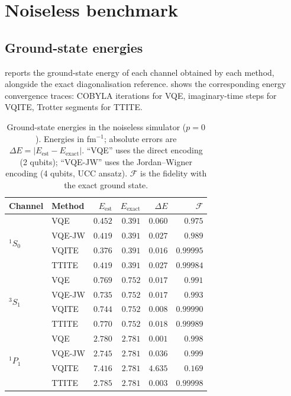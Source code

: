 \section{Noiseless benchmark}
\label{sec:noiseless}

\subsection{Ground-state energies}
\label{ssec:noiseless-ground}

 reports the ground-state energy of each channel
obtained by each method, alongside the exact diagonalisation reference.
 shows the corresponding energy convergence
traces: COBYLA iterations for VQE, imaginary-time steps for VQITE,
Trotter segments for TTITE.

\begin{table}[htbp]
\centering
\caption{Ground-state energies in the noiseless simulator
  ($p = 0$). Energies in fm$^{-1}$; absolute errors are
  $\Delta E = |E_{\mathrm{est}} - E_{\mathrm{exact}}|$. ``VQE'' uses
  the direct encoding (2 qubits); ``VQE-JW'' uses the Jordan--Wigner
  encoding (4 qubits, UCC ansatz). $\mathcal{F}$ is the fidelity with
  the exact ground state.}
\label{tab:noiseless}
\renewcommand{\arraystretch}{1.15}
\small
\begin{tabular}{llrrrr}
\toprule
Channel & Method   & $E_{\mathrm{est}}$ & $E_{\mathrm{exact}}$ & $\Delta E$  & $\mathcal{F}$ \\
\midrule
\multirow{4}{*}{${}^1S_0$}
        & VQE      & $0.452$ & $0.391$ & $0.060$ & $0.975$ \\
        & VQE-JW   & $0.419$ & $0.391$ & $0.027$ & $0.989$ \\
        & VQITE    & $0.376$ & $0.391$ & $0.016$ & $0.99995$ \\
        & TTITE    & $0.419$ & $0.391$ & $0.027$ & $0.99984$ \\
\midrule
\multirow{4}{*}{${}^3S_1$}
        & VQE      & $0.769$ & $0.752$ & $0.017$ & $0.991$ \\
        & VQE-JW   & $0.735$ & $0.752$ & $0.017$ & $0.993$ \\
        & VQITE    & $0.744$ & $0.752$ & $0.008$ & $0.99990$ \\
        & TTITE    & $0.770$ & $0.752$ & $0.018$ & $0.99989$ \\
\midrule
\multirow{4}{*}{${}^1P_1$}
        & VQE      & $2.780$ & $2.781$ & $0.001$ & $0.998$ \\
        & VQE-JW   & $2.745$ & $2.781$ & $0.036$ & $0.999$ \\
        & VQITE    & $7.416$ & $2.781$ & $4.635$ & $0.169$ \\
        & TTITE    & $2.785$ & $2.781$ & $0.003$ & $0.99998$ \\
\bottomrule
\end{tabular}
\end{table}

